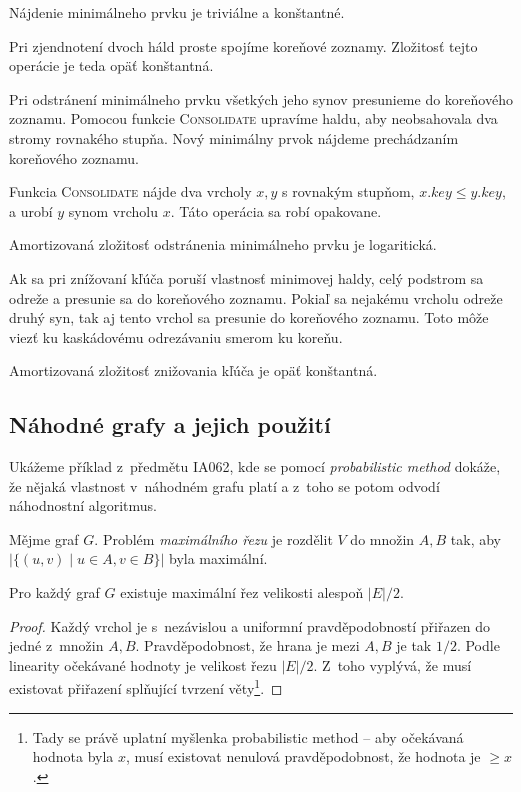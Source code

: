 Nájdenie minimálneho prvku je triviálne a konštantné.

Pri zjendnotení dvoch háld proste spojíme koreňové zoznamy. Zložitosť
tejto operácie je teda opäť konštantná.

Pri odstránení minimálneho prvku všetkých jeho synov presunieme do 
koreňového zoznamu. Pomocou funkcie \textsc{Consolidate} upravíme haldu,
aby neobsahovala dva stromy rovnakého stupňa. Nový minimálny 
prvok nájdeme prechádzaním koreňového zoznamu.

Funkcia \textsc{Consolidate} nájde dva vrcholy $x,y$ s rovnakým stupňom,
$x.key \leq y.key$, a urobí $y$ synom vrcholu $x$. Táto operácia
sa robí opakovane.

Amortizovaná zložitosť odstránenia minimálneho prvku je logaritická.

Ak sa pri znížovaní kľúča poruší vlastnosť minimovej haldy,
celý podstrom sa odreže a presunie sa do koreňového zoznamu.
Pokiaľ sa nejakému vrcholu odreže druhý syn, tak aj tento vrchol
sa presunie do koreňového zoznamu. Toto môže viezť ku kaskádovému
odrezávaniu smerom ku koreňu.

Amortizovaná zložitosť znižovania kľúča je opäť konštantná.



\subsection{Náhodné grafy a jejich použití}

Ukážeme příklad z~předmětu IA062, kde se pomocí {\em probabilistic
method} dokáže, že nějaká vlastnost v~náhodném grafu platí a z~toho se
potom odvodí náhodnostní algoritmus.


\begin{definition}
    Mějme graf $G$. Problém {\em maximálního řezu} je rozdělit $V$ do
    množin $A, B$ tak, aby $\lvert \{ (u,v) \mid u \in A, v \in B \}
    \rvert$ byla maximální.
\end{definition}

\begin{theorem}
    Pro každý graf $G$ existuje maximální řez velikosti alespoň
    $\lvert E \rvert / 2$.
\end{theorem}

\begin{proof}
    Každý vrchol je s~nezávislou a uniformní pravděpodobností přiřazen
    do jedné z~množin $A, B$. Pravděpodobnost, že hrana je mezi $A, B$
    je tak $1/2$. Podle linearity očekávané hodnoty je velikost řezu
    $\lvert E \rvert / 2$. Z~toho vyplývá, že musí existovat přiřazení
    splňující tvrzení věty\footnote{Tady se právě uplatní myšlenka
    probabilistic method -- aby očekávaná hodnota byla $x$, musí
    existovat nenulová pravděpodobnost, že hodnota je $\geq x$.}.
\end{proof}

